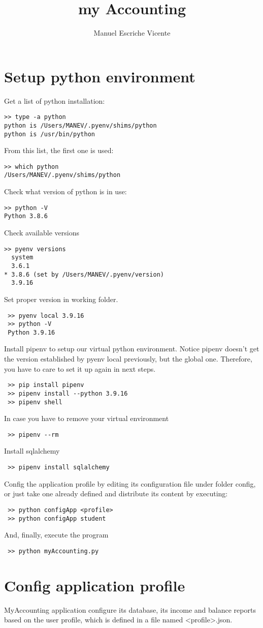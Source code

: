 \documentclass[12pt, a4paper]{article}
\title{my Accounting}
\author{Manuel Escriche Vicente}
\begin{document}
\maketitle
\begin{abstract}

\end{abstract}
\tableofcontents
\newpage

\section{Setup python environment}
Get a list of python installation:
\begin{verbatim}
>> type -a python
python is /Users/MANEV/.pyenv/shims/python
python is /usr/bin/python
\end{verbatim}
From this list, the first one is used:
\begin{verbatim}
>> which python
/Users/MANEV/.pyenv/shims/python
\end{verbatim}
Check what version of python is in use:
\begin{verbatim}
>> python -V
Python 3.8.6
\end{verbatim}
Check available versions
\begin{verbatim}
>> pyenv versions
  system
  3.6.1
* 3.8.6 (set by /Users/MANEV/.pyenv/version)
  3.9.16
\end{verbatim}
Set proper version in working folder.  
\begin{verbatim}
 >> pyenv local 3.9.16
 >> python -V 
 Python 3.9.16
 \end{verbatim}
 Install pipenv to setup our virtual python environment. Notice pipenv doesn't get the version established by pyenv local previously, but the global one. Therefore, you have to care to set it up again in next steps.
 \begin{verbatim}
 >> pip install pipenv
 >> pipenv install --python 3.9.16
 >> pipenv shell
 \end{verbatim}
 In case you have to remove your virtual environment 
 \begin{verbatim}
 >> pipenv --rm
 \end{verbatim}
 Install sqlalchemy
 \begin{verbatim}
 >> pipenv install sqlalchemy
 \end{verbatim}
 Config the application profile by editing its configuration file under folder config, or just take one already defined and distribute its content by executing:
 \begin{verbatim}
 >> python configApp <profile>
 >> python configApp student
 \end{verbatim}
 And, finally, execute the program
 \begin{verbatim}
 >> python myAccounting.py
 \end{verbatim} 
 \section{Config application profile}
 MyAccounting application configure its database, its income and balance reports based on the user profile, which is defined in a file named <profile>.json.
  
\end{document}
